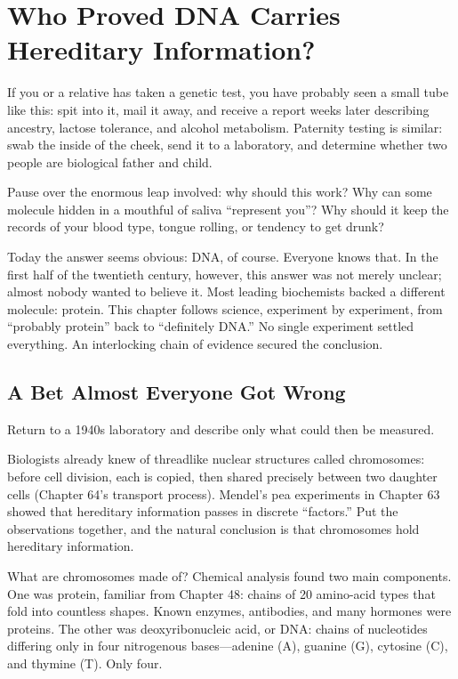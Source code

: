 \chapter{Who Proved DNA Carries Hereditary Information?}

\begin{kaichang}
If you or a relative has taken a genetic test, you have probably seen a small tube like this: spit into it, mail it away, and receive a report weeks later describing ancestry, lactose tolerance, and alcohol metabolism. Paternity testing is similar: swab the inside of the cheek, send it to a laboratory, and determine whether two people are biological father and child.

Pause over the enormous leap involved: why should this work? Why can some molecule hidden in a mouthful of saliva ``represent you''? Why should it keep the records of your blood type, tongue rolling, or tendency to get drunk?

Today the answer seems obvious: DNA, of course. Everyone knows that. In the first half of the twentieth century, however, this answer was not merely unclear; almost nobody wanted to believe it. Most leading biochemists backed a different molecule: protein. This chapter follows science, experiment by experiment, from ``probably protein'' back to ``definitely DNA.'' No single experiment settled everything. An interlocking chain of evidence secured the conclusion.
\end{kaichang}

\section{A Bet Almost Everyone Got Wrong}

Return to a 1940s laboratory and describe only what could then be measured.

Biologists already knew of threadlike nuclear structures called chromosomes: before cell division, each is copied, then shared precisely between two daughter cells (Chapter 64's transport process). Mendel's pea experiments in Chapter 63 showed that hereditary information passes in discrete ``factors.'' Put the observations together, and the natural conclusion is that chromosomes hold hereditary information.

What are chromosomes made of? Chemical analysis found two main components. One was protein, familiar from Chapter 48: chains of 20 amino-acid types that fold into countless shapes. Known enzymes, antibodies, and many hormones were proteins. The other was deoxyribonucleic acid, or DNA: chains of nucleotides differing only in four nitrogenous bases---adenine (A), guanine (G), cytosine (C), and thymine (T). Only four.

